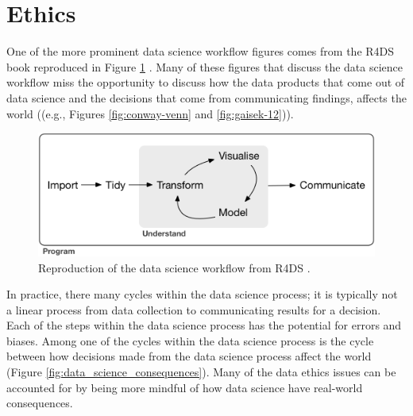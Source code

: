 \documentclass[../main.tex]{subfiles}
\begin{document}
    \section{Ethics}

    One of the more prominent data science workflow figures comes from the R4DS book reproduced in
    Figure \ref{fig:r4ds-data_science} \cite{wickhamR4ds}.
    Many of these figures that discuss the data science workflow miss the opportunity to discuss how
    the data products that come out of data science and the decisions that come from communicating findings,
    affects the world ((e.g., Figures \ref{fig:conway-venn} and \ref{fig:gaisek-12})).

    \begin{figure}[!hbtp]
        \centering
        \includegraphics[scale=0.75]{figs/050-intro/r4ds-data-science}
        \caption[R4DS: Data Science Workflow]{
        Reproduction of the data science workflow from R4DS \cite{wickhamR4ds}.
        }
        \label{fig:r4ds-data_science}
    \end{figure}

    In practice, there many cycles within the data science process; it is typically not a linear process from
    data collection to communicating results for a decision.
    Each of the steps within the data science process has the potential for errors and biases.
    Among one of the cycles within the data science process is the cycle between how decisions made from the data science process affect the world
    (Figure \ref{fig:data_science_consequences}).
    Many of the data ethics issues can be accounted for by being more mindful of how data science have real-world consequences.
\end{document}

